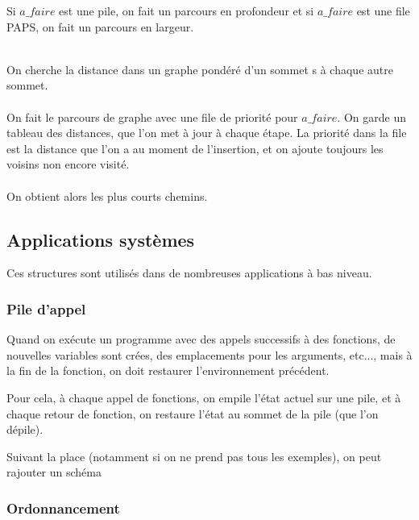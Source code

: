 Si $a\_faire$ est une pile, on fait un parcours en profondeur et si $a\_faire$ est une file PAPS, on fait un parcours en largeur.

\begin{algo}
	\enspace \\
	On cherche la distance dans un graphe pondéré d'un sommet s à chaque autre sommet.\\
	\\
	On fait le parcours de graphe avec une file de priorité pour $a\_faire$. On garde un tableau des distances, que l'on met à jour à chaque étape. La priorité dans la file est la distance que l'on a au moment de l'insertion, et on ajoute toujours les voisins non encore visité.\\
	\\
	On obtient alors les plus courts chemins.
\end{algo}

\subsection{Applications systèmes}

Ces structures sont utilisés dans de nombreuses applications à bas niveau.

\subsubsection{Pile d'appel}

Quand on exécute un programme avec des appels successifs à des fonctions, de nouvelles variables sont crées, des emplacements pour les arguments, etc..., mais à la fin de la fonction, on doit restaurer l'environnement précédent.

\begin{idee}
	Pour cela, à chaque appel de fonctions, on empile l'état actuel sur une pile, et à chaque retour de fonction, on restaure l'état au sommet de la pile (que l'on dépile).
\end{idee}

\begin{com}
	Suivant la place (notamment si on ne prend pas tous les exemples), on peut rajouter un schéma
\end{com}

\subsubsection{Ordonnancement}

